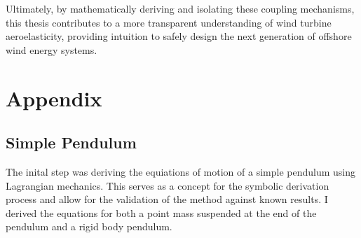 \documentclass[final,onecolumn]{IEEEtran}
\begin{document}
Ultimately, by mathematically deriving and isolating these coupling mechanisms, this thesis contributes to a more transparent understanding of wind turbine aeroelasticity, providing intuition to safely design the next generation of offshore wind energy systems.
\newpage
\appendix

\section{Appendix}\label{app:appendix}

\subsection{Simple Pendulum}\label{app:simple_pendulum}
The inital step was deriving the equiations of motion of a simple pendulum using Lagrangian mechanics. This serves as a concept for the symbolic derivation process and allow for the validation of the method against known results. I derived the equations for both a point mass suspended at the end of the pendulum and a rigid body pendulum.
\end{document}
